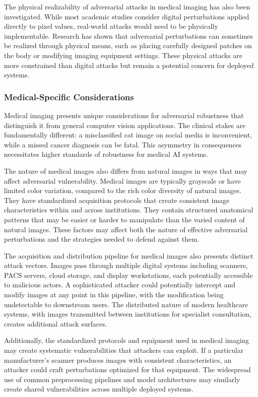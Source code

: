 \documentclass[12pt,a4paper]{article}
\begin{document}
The physical realizability of adversarial attacks in medical imaging has also been investigated. While most academic studies consider digital perturbations applied directly to pixel values, real-world attacks would need to be physically implementable. Research has shown that adversarial perturbations can sometimes be realized through physical means, such as placing carefully designed patches on the body or modifying imaging equipment settings. These physical attacks are more constrained than digital attacks but remain a potential concern for deployed systems.

\subsubsection{Medical-Specific Considerations}

Medical imaging presents unique considerations for adversarial robustness that distinguish it from general computer vision applications. The clinical stakes are fundamentally different: a misclassified cat image on social media is inconvenient, while a missed cancer diagnosis can be fatal. This asymmetry in consequences necessitates higher standards of robustness for medical AI systems.

The nature of medical images also differs from natural images in ways that may affect adversarial vulnerability. Medical images are typically grayscale or have limited color variation, compared to the rich color diversity of natural images. They have standardized acquisition protocols that create consistent image characteristics within and across institutions. They contain structured anatomical patterns that may be easier or harder to manipulate than the varied content of natural images. These factors may affect both the nature of effective adversarial perturbations and the strategies needed to defend against them.

The acquisition and distribution pipeline for medical images also presents distinct attack vectors. Images pass through multiple digital systems including scanners, PACS servers, cloud storage, and display workstations, each potentially accessible to malicious actors. A sophisticated attacker could potentially intercept and modify images at any point in this pipeline, with the modification being undetectable to downstream users. The distributed nature of modern healthcare systems, with images transmitted between institutions for specialist consultation, creates additional attack surfaces.

Additionally, the standardized protocols and equipment used in medical imaging may create systematic vulnerabilities that attackers can exploit. If a particular manufacturer's scanner produces images with consistent characteristics, an attacker could craft perturbations optimized for that equipment. The widespread use of common preprocessing pipelines and model architectures may similarly create shared vulnerabilities across multiple deployed systems.
\end{document}
